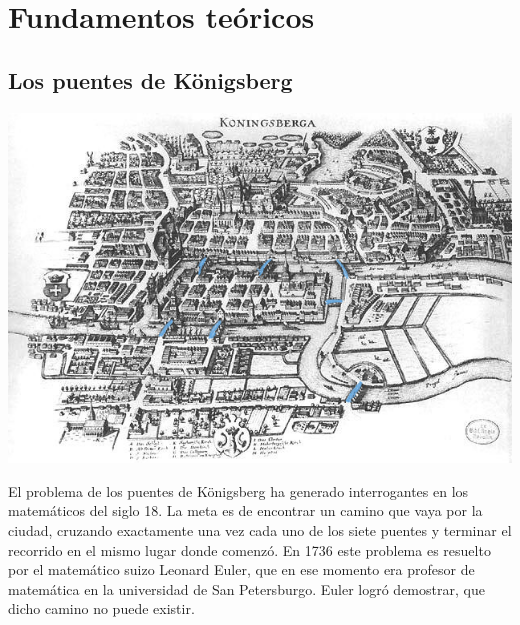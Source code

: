 \documentclass[12pt]{article}
\begin{document}
\section{Fundamentos te\'{o}ricos}
\subsection{Los puentes de K\"{o}nigsberg}
\begin{center}
\includegraphics[scale=0.5]{koenigsberg.jpg}
\end{center}
El problema de los puentes de K\"{o}nigsberg ha generado interrogantes en los matemáticos del siglo 18. La meta es de encontrar un camino que vaya por la ciudad, cruzando exactamente una vez cada uno de los siete puentes y terminar el recorrido en el mismo lugar donde comenzó. En 1736 este problema es resuelto por el matemático suizo Leonard Euler, que en ese momento era profesor de matemática en la universidad de San Petersburgo. Euler logró demostrar, que dicho camino no puede existir.
\end{document}

